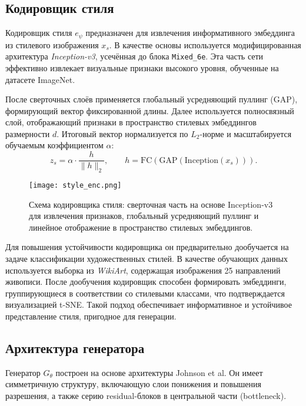\documentclass{article}
\begin{document}
\subsection*{Кодировщик стиля}

Кодировщик стиля $e_\psi$ предназначен для извлечения информативного эмбеддинга из стилевого изображения $x_s$.  
В качестве основы используется модифицированная архитектура \textit{Inception-v3}, усечённая до блока \texttt{Mixed\_6e}.  
Эта часть сети эффективно извлекает визуальные признаки высокого уровня, обученные на датасете ImageNet.  

После сверточных слоёв применяется глобальный усредняющий пуллинг (GAP), формирующий вектор фиксированной длины. Далее используется полносвязный слой, отображающий признаки в пространство стилевых эмбеддингов размерности $d$.  
Итоговый вектор нормализуется по $L_2$-норме и масштабируется обучаемым коэффициентом $\alpha$:
$$
z_s = \alpha \cdot \frac{h}{\|h\|_2}, \qquad h = \mathrm{FC}(\mathrm{GAP}(\mathrm{Inception}(x_s))).
$$

\begin{figure}[!h]
    \centering
    \texttt{[image: style\_enc.png]}
    \caption{Схема кодировщика стиля: сверточная часть на основе Inception-v3 для извлечения признаков, глобальный усредняющий пуллинг и линейное отображение в пространство стилевых эмбеддингов.}
    \label{fig:style_encoder}
\end{figure}

Для повышения устойчивости кодировщика он предварительно дообучается на задаче классификации художественных стилей.  
В качестве обучающих данных используется выборка из \textit{WikiArt}, содержащая изображения 25 направлений живописи.  
После дообучения кодировщик способен формировать эмбеддинги, группирующиеся в соответствии со стилевыми классами, что подтверждается визуализацией t-SNE.  
Такой подход обеспечивает информативное и устойчивое представление стиля, пригодное для генерации.

\subsection*{Архитектура генератора}

Генератор $G_\theta$ построен на основе архитектуры Johnson et al.  
Он имеет симметричную структуру, включающую слои понижения и повышения разрешения, а также серию residual-блоков в центральной части (bottleneck).  
\end{document}
